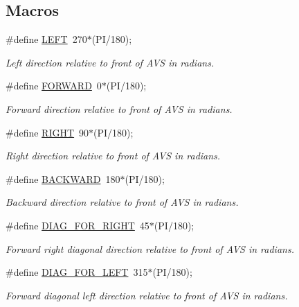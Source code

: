 \subsection*{Macros}
\begin{DoxyCompactItemize}
\item 
\#define \mbox{\hyperlink{bot_main_8ino_a437ef08681e7210d6678427030446a54}{L\+E\+FT}}~270$\ast$(PI/180);
\begin{DoxyCompactList}\small\item\em Left direction relative to front of A\+VS in radians. \end{DoxyCompactList}\item 
\#define \mbox{\hyperlink{bot_main_8ino_a6ddfdda7a062d10cff4a72b76b44aeb8}{F\+O\+R\+W\+A\+RD}}~0$\ast$(PI/180);
\begin{DoxyCompactList}\small\item\em Forward direction relative to front of A\+VS in radians. \end{DoxyCompactList}\item 
\#define \mbox{\hyperlink{bot_main_8ino_a80fb826a684cf3f0d306b22aa100ddac}{R\+I\+G\+HT}}~90$\ast$(PI/180);
\begin{DoxyCompactList}\small\item\em Right direction relative to front of A\+VS in radians. \end{DoxyCompactList}\item 
\#define \mbox{\hyperlink{bot_main_8ino_adf445abfe1b77fa63f89e315ccc2f7f2}{B\+A\+C\+K\+W\+A\+RD}}~180$\ast$(PI/180);
\begin{DoxyCompactList}\small\item\em Backward direction relative to front of A\+VS in radians. \end{DoxyCompactList}\item 
\#define \mbox{\hyperlink{bot_main_8ino_af0d4dc28dbd73c9eaadb8316bd959191}{D\+I\+A\+G\+\_\+\+F\+O\+R\+\_\+\+R\+I\+G\+HT}}~45$\ast$(PI/180);
\begin{DoxyCompactList}\small\item\em Forward right diagonal direction relative to front of A\+VS in radians. \end{DoxyCompactList}\item 
\#define \mbox{\hyperlink{bot_main_8ino_a7cfa9cd93a3a325dcce552ff4372733a}{D\+I\+A\+G\+\_\+\+F\+O\+R\+\_\+\+L\+E\+FT}}~315$\ast$(PI/180);
\begin{DoxyCompactList}\small\item\em Forward diagonal left direction relative to front of A\+VS in radians. \end{DoxyCompactList}\item 

\end{DoxyCompactItemize}
